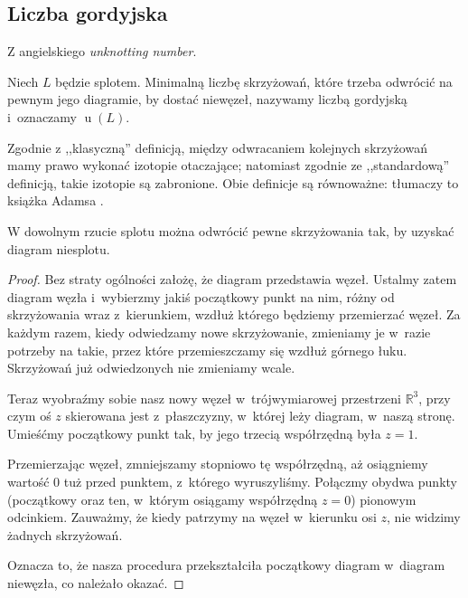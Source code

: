 \subsection{Liczba gordyjska} %
\label{sub:unknotting_number}
Z angielskiego \emph{unknotting number}.

\begin{definition}
    Niech $L$ będzie splotem.
    Minimalną liczbę skrzyżowań, które trzeba odwrócić na pewnym jego diagramie, by dostać niewęzeł, nazywamy liczbą gordyjską i~oznaczamy $\operatorname{u}(L)$.
\end{definition}

Zgodnie z ,,klasyczną'' definicją, między odwracaniem kolejnych skrzyżowań mamy prawo wykonać izotopie otaczające; natomiast zgodnie ze ,,standardową'' definicją, takie izotopie są zabronione.
Obie definicje są równoważne: tłumaczy to książka Adamsa \cite[s. 58]{adams94}.

\begin{lemma}
    \label{lem:unknotting_well_defined}
    W dowolnym rzucie splotu można odwrócić pewne skrzyżowania tak, by uzyskać diagram niesplotu.
\end{lemma}

\begin{proof}
    Bez straty ogólności założę, że diagram przedstawia węzeł.
    Ustalmy zatem diagram węzła i~wybierzmy jakiś początkowy punkt na nim, różny od skrzyżowania wraz z~kierunkiem, wzdłuż którego będziemy przemierzać węzeł.
    Za każdym razem, kiedy odwiedzamy nowe skrzyżowanie, zmieniamy je w~razie potrzeby na takie, przez które przemieszczamy się wzdłuż górnego łuku.
    Skrzyżowań już odwiedzonych nie zmieniamy wcale.

    Teraz wyobraźmy sobie nasz nowy węzeł w~trójwymiarowej przestrzeni $\mathbb R^3$, przy czym oś $z$ skierowana jest z~płaszczyzny, w~której leży diagram, w~naszą stronę.
    Umieśćmy początkowy punkt tak, by jego trzecią współrzędną była $z = 1$.

    Przemierzając węzeł, zmniejszamy stopniowo tę współrzędną, aż osiągniemy wartość $0$ tuż przed punktem, z~którego wyruszyliśmy.
    Połączmy obydwa punkty (początkowy oraz ten, w~którym osiągamy współrzędną $z = 0$) pionowym odcinkiem.
    Zauważmy, że kiedy patrzymy na węzeł w~kierunku osi $z$, nie widzimy żadnych skrzyżowań.

    Oznacza to, że nasza procedura przekształciła początkowy diagram w~diagram niewęzła, co należało okazać.
\end{proof}

